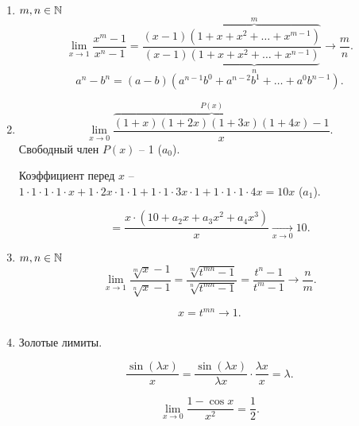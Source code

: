 \begin{enumerate}
\item
    $m, n \in \mathbb{N}$
    \begin{equation*}
        \lim_{x \to 1} \frac{x^{m} - 1}{x^{n} - 1} 
        = \frac{(x - 1)\overbrace{(1 + x + x^2 + \dots + x^{m - 1})}^{m}}{(x - 1)\underbrace{(1 + x + x^2 + \dots + x^{n - 1})}_n}
        \xrightarrow[]{} \frac{m}{n}
    .\end{equation*}
    \begin{equation*}
        a^{n} - b^{n} = (a - b)(a^{n - 1}b^0 + a^{n - 2}b^1 + \dots + a^0b^{n - 1})
    .\end{equation*}

\item
    \begin{equation*}
        \lim_{x \to 0} \frac{\overbrace{(1 + x)(1 + 2x)(1 + 3x)(1 + 4x)}^{P(x)} - 1}{x}
    .\end{equation*}
    Свободный член $P(x)$ -- 1 ($a_0$).
    
    Коэффициент перед $x$ -- $1 \cdot 1 \cdot 1 \cdot 1 \cdot x + 1 \cdot 2x \cdot 1 \cdot 1 + 1 \cdot 1 \cdot 3x \cdot 1 + 1 \cdot 1 \cdot 1 \cdot 4x = 10x$ ($a_1$).

    \begin{equation*}
        = \frac{x \cdot \left(10 + a_2 x + a_3 x^2 + a_4 x^3\right)}{x}
        \xrightarrow[x \to 0]{} 10
    .\end{equation*}

\item
    $m, n \in \mathbb{N}$
    \begin{equation*}
        \lim_{x \to 1} \frac{\sqrt[m]{x} - 1}{\sqrt[n]{x} - 1}
        = \frac{\sqrt[m]{t^{mn} - 1}}{\sqrt[n]{t^{mn} - 1}} 
        = \frac{t^n - 1}{t^m - 1} 
        \xrightarrow[]{} \frac{n}{m}
    .\end{equation*}

    \begin{equation*}
        x = t^{mn} \xrightarrow[]{} 1
    .\end{equation*}

\item
    Золотые лимиты.

    \begin{equation*}
        \frac{\sin(\lambda x)}{x} 
        = \frac{\sin(\lambda x)}{\lambda x} \cdot \frac{\lambda x}{x} 
        = \lambda
    .\end{equation*}

    \begin{equation*}
        \lim_{x \to 0} \frac{1 - \cos x}{x^2} 
        = \frac{1}{2}
    .\end{equation*}


\end{enumerate}
